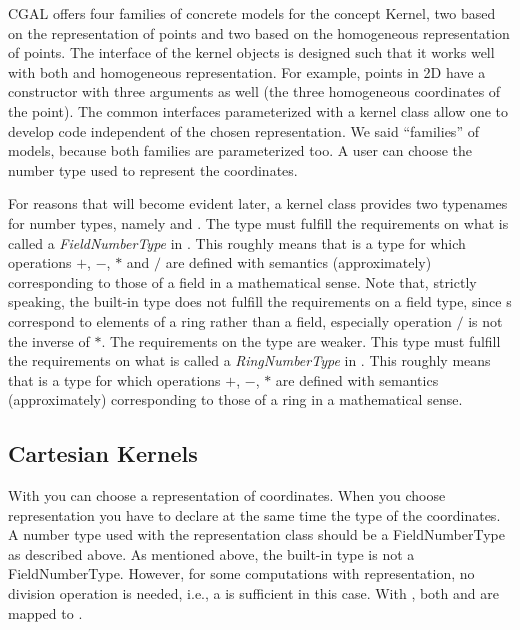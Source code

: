 CGAL offers four families of concrete models for the concept Kernel,
two based on the  representation of
points and two based on the homogeneous representation of points. The
interface of the kernel objects is designed such that it works well
with both  and homogeneous
representation. For example, points in 2D have a constructor with
three arguments as well (the three homogeneous coordinates of the
point).  The common interfaces parameterized with a kernel class allow
one to develop code independent of the chosen representation.  We said
``families'' of models, because both families are parameterized too.
A user can choose the number type used to represent the coordinates.

For reasons that will become evident later, a kernel class provides
two typenames for number types, namely  and .
The type  must fulfill the
requirements on what is called a {\em FieldNumberType} in \cgal. This
roughly means that  is a type for which operations
$+$, $-$, $*$ and $/$ are defined with semantics (approximately)
corresponding to those of a field in a mathematical sense. Note that,
strictly speaking, the built-in type  does not fulfill the
requirements on a field type, since s correspond to elements
of a ring rather than a field, especially operation $/$ is not the
inverse of $*$.  The requirements on the type  are
weaker.  This type must fulfill the requirements on what is called a
{\em RingNumberType} in \cgal. This roughly means that
 is a type for which operations $+$, $-$, $*$ are
defined with semantics (approximately) corresponding to those of a
ring in a mathematical sense. 

\subsection{Cartesian Kernels}
With  you can choose a
 representation of coordinates. When you
choose  representation you have to
declare at the same time the type of the coordinates.  A number type
used with the  representation class should be a
FieldNumberType as described above. As mentioned above, the built-in
type  is not a FieldNumberType. However, for some
computations with  representation, no
division operation is needed, i.e., a  is sufficient in
this case. With , both
 and
 are mapped to
.

